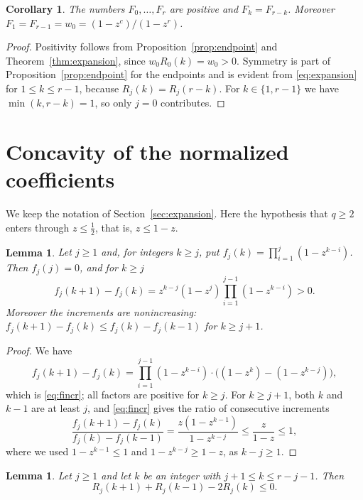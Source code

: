 \documentclass{amsart}
\newtheorem{lemma}[theorem]{Lemma}
\newtheorem{corollary}[theorem]{Corollary}
\theoremstyle{remark}
\numberwithin{equation}{section}
\begin{document}
\begin{corollary}\label{cor:positive}
The numbers $F_0,\dots,F_r$ are positive and $F_k=F_{r-k}$. Moreover $F_1=F_{r-1}=w_0=(1-z^c)/(1-z^r)$.
\end{corollary}

\begin{proof}
Positivity follows from Proposition~\ref{prop:endpoint} and Theorem~\ref{thm:expansion}, since $w_0R_0(k)=w_0>0$. Symmetry is part of Proposition~\ref{prop:endpoint} for the endpoints and is evident from \eqref{eq:expansion} for $1\le k\le r-1$, because $R_j(k)=R_j(r-k)$. For $k\in\{1,r-1\}$ we have $\min(k,r-k)=1$, so only $j=0$ contributes.
\end{proof}

\section{Concavity of the normalized coefficients}\label{sec:concavity}

We keep the notation of Section~\ref{sec:expansion}. Here the hypothesis that $q\ge2$ enters through $z\le\frac12$, that is, $z\le1-z$.

\begin{lemma}\label{lem:f}
Let $j\ge1$ and, for integers $k\ge j$, put $f_j(k)=\prod_{i=1}^{j}(1-z^{k-i})$. Then $f_j(j)=0$, and for $k\ge j$
\begin{equation}\label{eq:fincr}
  f_j(k+1)-f_j(k)=z^{k-j}(1-z^j)\prod_{i=1}^{j-1}(1-z^{k-i})>0.
\end{equation}
Moreover the increments are nonincreasing: $f_j(k+1)-f_j(k)\le f_j(k)-f_j(k-1)$ for $k\ge j+1$.
\end{lemma}

\begin{proof}
We have
\[
  f_j(k+1)-f_j(k)=\prod_{i=1}^{j-1}(1-z^{k-i})\cdot\bigl((1-z^{k})-(1-z^{k-j})\bigr),
\]
which is \eqref{eq:fincr}; all factors are positive for $k\ge j$. For $k\ge j+1$, both $k$ and $k-1$ are at least $j$, and \eqref{eq:fincr} gives the ratio of consecutive increments
\[
  \frac{f_j(k+1)-f_j(k)}{f_j(k)-f_j(k-1)}=\frac{z(1-z^{k-1})}{1-z^{k-j}}\le\frac{z}{1-z}\le1,
\]
where we used $1-z^{k-1}\le1$ and $1-z^{k-j}\ge1-z$, as $k-j\ge1$.
\end{proof}

\begin{lemma}\label{lem:Rconcave}
Let $j\ge1$ and let $k$ be an integer with $j+1\le k\le r-j-1$. Then
\[
  R_j(k+1)+R_j(k-1)-2R_j(k)\le0.
\]
\end{lemma}
\end{document}
